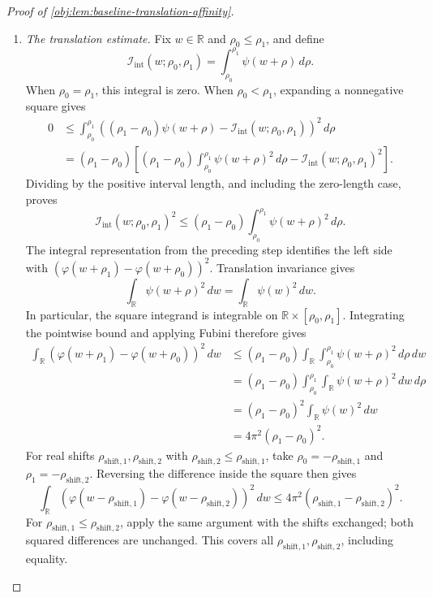 \documentclass[11pt]{article}
\begin{document}
\begin{proof}[Proof of \cref{obj:lem:baseline-translation-affinity}]
\begin{enumerate}
\item \emph{The translation estimate.}
Fix \(w\in\mathbb R\) and \(\rho_0\le\rho_1\), and define
\[
\mathcal I_{\mathrm{int}}(w;\rho_0,\rho_1)
=\int_{\rho_0}^{\rho_1}\psi(w+\rho)\,d\rho.
\]
When \(\rho_0=\rho_1\), this integral is zero. When \(\rho_0<\rho_1\), expanding a nonnegative square gives
\[
\begin{aligned}
0
&\le
\int_{\rho_0}^{\rho_1}
\left((\rho_1-\rho_0)\psi(w+\rho)
      -\mathcal I_{\mathrm{int}}(w;\rho_0,\rho_1)\right)^2\,d\rho\\
&=(\rho_1-\rho_0)
\left[
(\rho_1-\rho_0)\int_{\rho_0}^{\rho_1}\psi(w+\rho)^2\,d\rho
-\mathcal I_{\mathrm{int}}(w;\rho_0,\rho_1)^2
\right].
\end{aligned}
\]
Dividing by the positive interval length, and including the zero-length case, proves
\[
\mathcal I_{\mathrm{int}}(w;\rho_0,\rho_1)^2
\le
(\rho_1-\rho_0)\int_{\rho_0}^{\rho_1}\psi(w+\rho)^2\,d\rho.
\]
The integral representation from the preceding step identifies the left side with
\((\varphi(w+\rho_1)-\varphi(w+\rho_0))^2\).
Translation invariance gives
\[
\int_{\mathbb R}\psi(w+\rho)^2\,dw
=\int_{\mathbb R}\psi(w)^2\,dw.
\]
In particular, the square integrand is integrable on
\(\mathbb R\times[\rho_0,\rho_1]\). Integrating the pointwise bound and applying Fubini therefore gives
\[
\begin{aligned}
\int_{\mathbb R}
(\varphi(w+\rho_1)-\varphi(w+\rho_0))^2\,dw
&\le
(\rho_1-\rho_0)
\int_{\mathbb R}\int_{\rho_0}^{\rho_1}
\psi(w+\rho)^2\,d\rho\,dw\\
&=(\rho_1-\rho_0)
\int_{\rho_0}^{\rho_1}\int_{\mathbb R}
\psi(w+\rho)^2\,dw\,d\rho\\
&=(\rho_1-\rho_0)^2\int_{\mathbb R}\psi(w)^2\,dw\\
&=4\pi^2(\rho_1-\rho_0)^2.
\end{aligned}
\]
For real shifts \(\rho_{\mathrm{shift},1},\rho_{\mathrm{shift},2}\) with \(\rho_{\mathrm{shift},2}\le\rho_{\mathrm{shift},1}\), take \(\rho_0=-\rho_{\mathrm{shift},1}\) and \(\rho_1=-\rho_{\mathrm{shift},2}\). Reversing the difference inside the square then gives
\[
\int_{\mathbb R}(\varphi(w-\rho_{\mathrm{shift},1})-\varphi(w-\rho_{\mathrm{shift},2}))^2\,dw
\le4\pi^2(\rho_{\mathrm{shift},1}-\rho_{\mathrm{shift},2})^2.
\]
For \(\rho_{\mathrm{shift},1}\le\rho_{\mathrm{shift},2}\), apply the same argument with the shifts exchanged; both squared differences are unchanged. This covers all \(\rho_{\mathrm{shift},1},\rho_{\mathrm{shift},2}\), including equality.


\end{enumerate}
\end{proof}
\end{document}
